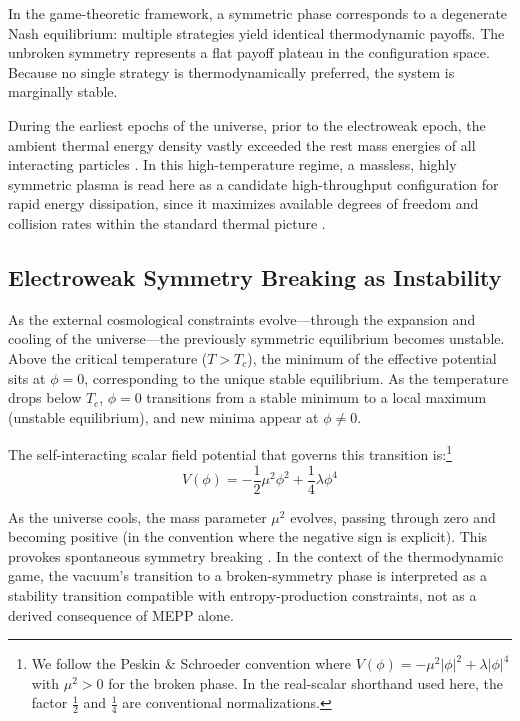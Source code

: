 \documentclass[12pt,a4paper]{article}
\theoremstyle{remark}
\begin{document}
In the game-theoretic framework, a symmetric phase corresponds to a degenerate Nash equilibrium: multiple strategies yield identical thermodynamic payoffs. The unbroken symmetry represents a flat payoff plateau in the configuration space. Because no single strategy is thermodynamically preferred, the system is marginally stable.

During the earliest epochs of the universe, prior to the electroweak epoch, the ambient thermal energy density vastly exceeded the rest mass energies of all interacting particles \citep{HiggsVEV}. In this high-temperature regime, a massless, highly symmetric plasma is read here as a candidate high-throughput configuration for rapid energy dissipation, since it maximizes available degrees of freedom and collision rates within the standard thermal picture \citep{HiggsVEV2024}.

\subsection{Electroweak Symmetry Breaking as Instability}

As the external cosmological constraints evolve---through the expansion and cooling of the universe---the previously symmetric equilibrium becomes unstable. Above the critical temperature ($T > T_c$), the minimum of the effective potential sits at $\phi = 0$, corresponding to the unique stable equilibrium. As the temperature drops below $T_c$, $\phi = 0$ transitions from a stable minimum to a local maximum (unstable equilibrium), and new minima appear at $\phi \neq 0$.

The self-interacting scalar field potential that governs this transition is:\footnote{We follow the Peskin \& Schroeder convention \citep{HiggsVEV} where $V(\phi) = -\mu^2 |\phi|^2 + \lambda |\phi|^4$ with $\mu^2 > 0$ for the broken phase. In the real-scalar shorthand used here, the factor $\frac{1}{2}$ and $\frac{1}{4}$ are conventional normalizations.}
\begin{equation}
V(\phi) = -\frac{1}{2}\mu^2 \phi^2 + \frac{1}{4}\lambda \phi^4
\end{equation}

As the universe cools, the mass parameter $\mu^2$ evolves, passing through zero and becoming positive (in the convention where the negative sign is explicit). This provokes spontaneous symmetry breaking \citep{HiggsVEV2024}. In the context of the thermodynamic game, the vacuum's transition to a broken-symmetry phase is interpreted as a stability transition compatible with entropy-production constraints, not as a derived consequence of MEPP alone.
\end{document}
